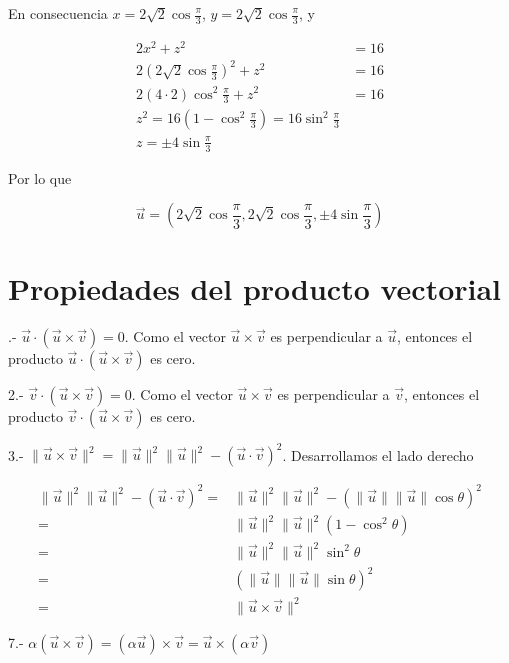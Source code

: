 \documentclass{article}
\begin{document}
En consecuencia $\boxed{x = 2\sqrt{2} \cos{\frac{\pi}{3}}}$, $\boxed{y =  2\sqrt{2} \cos{\frac{\pi}{3}}}$, y 

\begin{equation}
\begin{split}
2x^2+z^2&=16 \\
2(2\sqrt{2} \cos{\frac{\pi}{3}})^2+z^2&=16 \\
2(4\cdot2) \cos^2{\frac{\pi}{3}}+z^2&=16 \\
z^2=16(1-\cos^2{\frac{\pi}{3}}) = 16\sin^2{\frac{\pi}{3}} \\
\boxed{z = \pm 4 \sin{\frac{\pi}{3}}}
\end{split}
\end{equation}

Por lo que 

$$
\vec{u} = \left(2\sqrt{2} \cos{\frac{\pi}{3}},2\sqrt{2} \cos{\frac{\pi}{3}},\pm 4 \sin{\frac{\pi}{3}}\right)
$$

\section*{Propiedades del producto vectorial}
.- $\vec{u}\cdot(\vec{u}\times\vec{v}) = 0$.
Como el vector $\vec{u}\times\vec{v}$ es perpendicular a $\vec{u}$, entonces el producto $\vec{u}\cdot(\vec{u}\times\vec{v})$ es cero.

2.- $\vec{v}\cdot(\vec{u}\times\vec{v}) = 0$.
Como el vector $\vec{u}\times\vec{v}$ es perpendicular a $\vec{v}$, entonces el producto $\vec{v}\cdot(\vec{u}\times\vec{v})$ es cero.

3.- $\| \vec{u} \times \vec{v} \|^2 = \|\vec{u}\|^2 \|\vec{u}\|^2 - (\vec{u}\cdot\vec{v})^2$.
Desarrollamos el lado derecho

\begin{equation}
\begin{split}
\|\vec{u}\|^2 \|\vec{u}\|^2 - (\vec{u}\cdot\vec{v})^2 = & \|\vec{u}\|^2 \|\vec{u}\|^2 - \left(\|\vec{u}\| \|\vec{u}\| \cos{\theta}\right)^2 \\
= & \|\vec{u}\|^2 \|\vec{u}\|^2 (1 - \cos^2{\theta}) \\
= & \|\vec{u}\|^2 \|\vec{u}\|^2 \sin^2{\theta} \\
= & \left(\|\vec{u}\| \|\vec{u}\|  \sin{\theta}\right)^2 \\
= & \| \vec{u} \times \vec{v} \|^2
\end{split} 
\end{equation}

7.- $\alpha\left(\vec{u}\times\vec{v}\right)=(\alpha \vec{u}) \times \vec{v} = \vec{u} \times (\alpha \vec{v})$
\end{document}
